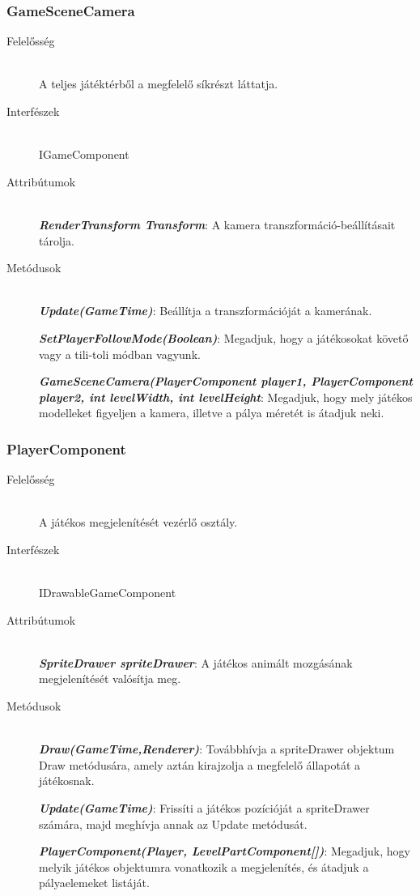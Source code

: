 	
	
\subsubsection{GameSceneCamera}
	\begin{description}
		\item[Felelősség] \hfill \\
		A teljes játéktérből a megfelelő síkrészt láttatja.
		\item[Interfészek] \hfill \\
		IGameComponent
		\item[Attribútumok] \hfill \\
		\textbf{\emph{RenderTransform Transform}}: A kamera transzformáció-beállításait tárolja.

		\item[Metódusok] \hfill \\
		\textbf{\emph{Update(GameTime)}}: Beállítja a transzformációját a kamerának.

		\textbf{\emph{SetPlayerFollowMode(Boolean)}}: Megadjuk, hogy a játékosokat követő vagy a tili-toli módban vagyunk.
		
		\textbf{\emph{GameSceneCamera(PlayerComponent player1, PlayerComponent player2, int levelWidth, int levelHeight}}: Megadjuk, hogy mely játékos modelleket figyeljen a kamera, illetve a pálya méretét is átadjuk neki.
	\end{description}

\subsubsection{PlayerComponent}
	\begin{description}
		\item[Felelősség] \hfill \\
		A játékos megjelenítését vezérlő osztály.
		\item[Interfészek] \hfill \\
		IDrawableGameComponent
		\item[Attribútumok] \hfill \\
		\textbf{\emph{SpriteDrawer spriteDrawer}}: A játékos animált mozgásának megjelenítését valósítja meg.

		\item[Metódusok] \hfill \\
		\textbf{\emph{Draw(GameTime,Renderer)}}: Továbbhívja a spriteDrawer objektum Draw metódusára, amely aztán kirajzolja a megfelelő állapotát a játékosnak.

		\textbf{\emph{Update(GameTime)}}: Frissíti a játékos pozícióját a spriteDrawer számára, majd meghívja annak az Update metódusát.

		\textbf{\emph{PlayerComponent(Player, LevelPartComponent[])}}: Megadjuk, hogy melyik játékos objektumra vonatkozik a megjelenítés, és átadjuk a pályaelemeket listáját.
		
	\end{description}
	

